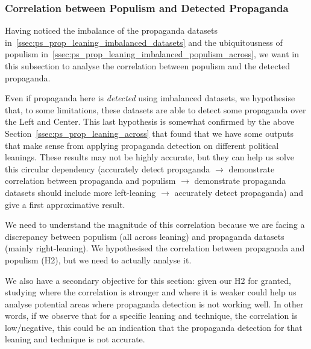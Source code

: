 \subsubsection{\statusgreen Correlation between Populism and Detected Propaganda}
\label{ssec:ps_prop_leaning_imbalanced_correlation_populism}

Having noticed the imbalance of the propaganda datasets in~\ref{ssec:ps_prop_leaning_imbalanced_datasets} and the ubiquitousness of populism in~\ref{ssec:ps_prop_leaning_imbalanced_populism_across}, we want in this subsection to analyse the correlation between populism and the detected propaganda.

Even if propaganda here is \textit{detected} using imbalanced datasets, we hypothesise that, to some limitations, these datasets are able to detect some propaganda over the Left and Center. This last hypothesis is somewhat confirmed by the above Section~\ref{ssec:ps_prop_leaning_across} that found that we have some outputs that make sense from applying propaganda detection on different political leanings.
These results may not be highly accurate, but they can help us solve this circular dependency (accurately detect propaganda $\rightarrow$ demonstrate correlation between propaganda and populism $\rightarrow$ demonstrate propaganda datasets should include more left-leaning $\rightarrow$ accurately detect propaganda) and give a first approximative result.

We need to understand the magnitude of this correlation because we are facing a discrepancy between populism (all across leaning) and propaganda datasets (mainly right-leaning).
We hypothesised the correlation between propaganda and populism (H2), but we need to actually analyse it.

We also have a secondary objective for this section: given our H2 for granted, studying where the correlation is stronger and where it is weaker could help us analyse potential areas where propaganda detection is not working well. In other words, if we observe that for a specific leaning and technique, the correlation is low/negative, this could be an indication that the propaganda detection for that leaning and technique is not accurate.


